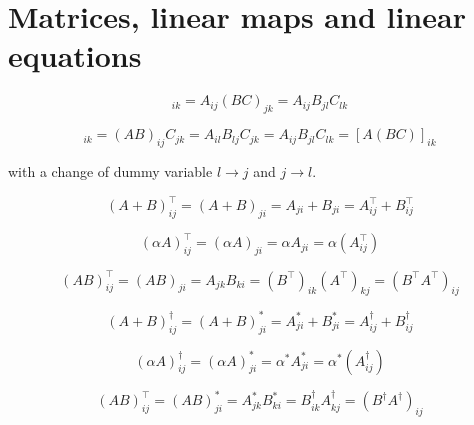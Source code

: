 \documentclass[12pt]{article}
\begin{document}



\pagebreak
\section*{Matrices, linear maps and linear equations}




\begin{equation}
    [A(BC)]_{ik} = A_{ij} (BC)_{jk} = A_{ij} B_{jl} C_{lk}
\end{equation}

\begin{equation}
    [(AB)C]_{ik} = (AB)_{ij} C_{jk} = A_{il} B_{lj} C_{jk} = A_{ij} B_{jl} C_{lk} = [A(BC)]_{ik}
\end{equation}

with a change of dummy variable $l \to j$ and $j \to l$.


\begin{equation}
    (A + B)_{ij}^{\intercal} = (A + B)_{ji} = A_{ji} + B_{ji} = A_{ij}^{\intercal} + B_{ij}^{\intercal}
\end{equation}

\begin{equation}
    (\alpha A)_{ij}^{\intercal} = (\alpha A)_{ji} = \alpha A_{ji} = \alpha (A_{ij}^{\intercal})
\end{equation}

\begin{equation}
    (AB)_{ij}^{\intercal} = (AB)_{ji} = A_{jk} B_{ki} = (B^{\intercal})_{ik} (A^{\intercal})_{kj} = (B^{\intercal} A^{\intercal})_{ij}
\end{equation}


\begin{equation}
    (A + B)_{ij}^{\dagger} = (A + B)_{ji}^{*} = A_{ji}^{*} + B_{ji}^{*} = A_{ij}^{\dagger} + B_{ij}^{\dagger}
\end{equation}

\begin{equation}
    (\alpha A)_{ij}^{\dagger} = (\alpha A)_{ji}^{*} = \alpha^{*} A_{ji}^{*} = \alpha^{*} (A_{ij}^{\dagger})
\end{equation}

\begin{equation}
    (AB)_{ij}^{\intercal} = (AB)_{ji}^{*} = A_{jk}^{*} B_{ki}^{*} = B^{\dagger}_{ik} A^{\dagger}_{kj} = (B^{\dagger} A^{\dagger})_{ij}
\end{equation}
\end{document}
